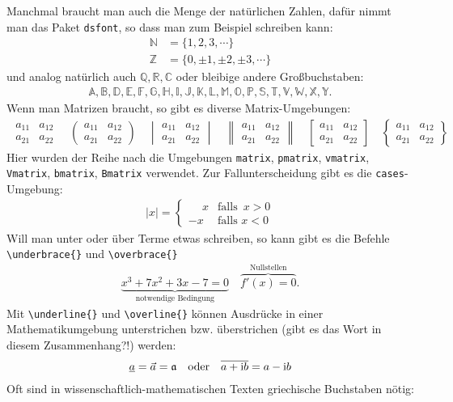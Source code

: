 Manchmal braucht man auch die Menge der natürlichen Zahlen, dafür nimmt man das
Paket \texttt{dsfont}, so dass man zum Beispiel schreiben kann:
%
\begin{align}
	\mathds{N} & = \{1, 2, 3, \cdots \}                \\
	\mathds{Z} & = \{0, \pm 1, \pm 2, \pm 3, \cdots \}
\end{align}
%
und analog natürlich auch $\mathds{Q, R, C}$ oder bleibige andere Großbuchstaben:
%
\begin{align*}
	\mathds{A, B, D, E, F, G, H, I, J, K, L, M, O, P, S, T, V, W, X, Y}.
\end{align*}
%
Wenn man Matrizen braucht, so gibt es diverse Matrix-Umgebungen:
%
\begin{align*}
	\begin{matrix}a_{11}&a_{12}\\ a_{21}&a_{22}\end{matrix} \quad \begin{pmatrix}a_{11}&a_{12}\\ a_{21}&a_{22}\end{pmatrix} \quad \begin{vmatrix}a_{11}&a_{12}\\ a_{21}&a_{22}\end{vmatrix} \quad \begin{Vmatrix}a_{11}&a_{12}\\ a_{21}&a_{22}\end{Vmatrix} \quad \begin{bmatrix}a_{11}&a_{12}\\ a_{21}&a_{22}\end{bmatrix} \quad \begin{Bmatrix}a_{11}&a_{12}\\ a_{21}&a_{22}\end{Bmatrix} \quad
\end{align*}
%
Hier wurden der Reihe nach die Umgebungen \texttt{matrix}, \texttt{pmatrix},
\texttt{vmatrix}, \texttt{Vmatrix}, \texttt{bmatrix}, \texttt{Bmatrix} verwendet.
Zur Fallunterscheidung gibt es die \texttt{cases}-Umgebung:
%
\begin{align*}
	|x| = \begin{cases}\phantom{-}x & \text{falls } \, x>0 \\ -x & \text{falls } x< 0\end{cases}
\end{align*}
%
Will man unter oder über Terme etwas schreiben, so kann gibt es die Befehle {\lstinline!\underbrace{}!}
und {\lstinline!\overbrace{}!}
\begin{align}
	\underbrace{x^3 + 7x^2 + 3x -7 = 0}_{\text{notwendige Bedingung}}\quad \overbrace{f'(x) = 0}^{\text{Nullstellen}}.
\end{align}
%
Mit {\lstinline!\underline{}!} und {\lstinline!\overline{}!} können Ausdrücke in
einer Mathematikumgebung unterstrichen bzw. überstrichen (gibt es das Wort in diesem
Zusammenhang?!) werden:
%
\begin{align*}
	\underline{a}= \vec{a}= \frak{a}\quad \text{oder}\quad \overline{a + \text{i} b}= a - \text{i}b
\end{align*}
%
Oft sind in wissenschaftlich-mathematischen Texten griechische Buchstaben nötig:
%

